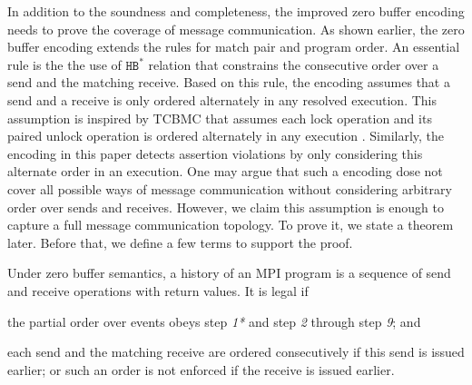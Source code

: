 
In addition to the soundness and completeness, the improved zero buffer encoding needs to prove the coverage of message communication. As shown earlier, the zero buffer encoding extends the rules for match pair and program order. An essential rule is the the use of $\mathtt{HB^*}$ relation that constrains the consecutive order over a send and the matching receive. Based on this rule, the encoding assumes that a send and a receive is only ordered alternately in any resolved execution. This assumption is inspired by TCBMC that assumes each lock operation and its paired unlock operation is ordered alternately in any execution \cite{DBLP:conf/cav/RabinovitzG05}. Similarly, the encoding in this paper detects assertion violations by only considering this alternate order in an execution. One may argue that such a encoding dose not cover all possible ways of message communication without considering arbitrary order over sends and receives. However, we claim this assumption is enough to capture a full message communication topology. To prove it, we state a theorem later.  Before that, we define a few terms to support the proof.

\begin{definition}\label{def:legal}
Under zero buffer semantics, a history of an MPI program is a sequence of send and receive operations with return values. It is legal if
\begin{compactenum}
\item the partial order over events obeys step \textit{1*} and step \textit{2} through step \textit{9}; and 
\item each send and the matching receive are ordered consecutively if this send is issued earlier; or such an order is not enforced if the receive is issued earlier.
\end{compactenum}
\end{definition}

